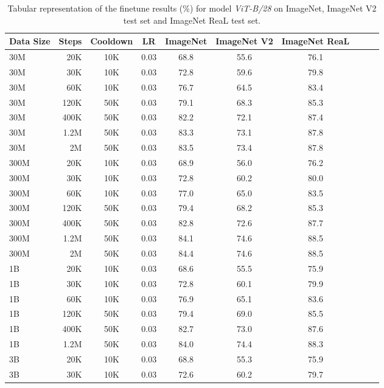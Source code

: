\begin{table}[h]
  \setlength{\tabcolsep}{5pt}
  \setlength{\extrarowheight}{5pt}
  \renewcommand{\arraystretch}{0.75}
  \centering
  \caption{Tabular representation of the finetune results (\%) for model \emph{ViT-B/28} on ImageNet, ImageNet V2 test set and ImageNet ReaL test set.}\label{tbl:b_28_ft}
  \begin{tabulary}{1.0\textwidth}{l r c c c c c c c c}
    \toprule[1pt]
    \bf{Data Size} & \bf{Steps} & \bf{Cooldown} & \bf{LR} & \bf{ImageNet} & \bf{ImageNet V2} & \bf{ImageNet ReaL} \\
    \midrule
30M   & 20K   & 10K   & 0.03 & 68.8 & 55.6 & 76.1 \\
30M   & 30K   & 10K   & 0.03 & 72.8 & 59.6 & 79.8 \\
30M   & 60K   & 10K   & 0.03 & 76.7 & 64.5 & 83.4 \\
30M   & 120K  & 50K   & 0.03 & 79.1 & 68.3 & 85.3 \\
30M   & 400K  & 50K   & 0.03 & 82.2 & 72.1 & 87.4 \\
30M   & 1.2M  & 50K   & 0.03 & 83.3 & 73.1 & 87.8 \\
30M   & 2M    & 50K   & 0.03 & 83.5 & 73.4 & 87.8 \\
\midrule[0.25pt]
300M  & 20K   & 10K   & 0.03 & 68.9 & 56.0 & 76.2 \\
300M  & 30K   & 10K   & 0.03 & 72.8 & 60.2 & 80.0 \\
300M  & 60K   & 10K   & 0.03 & 77.0 & 65.0 & 83.5 \\
300M  & 120K  & 50K   & 0.03 & 79.4 & 68.2 & 85.3 \\
300M  & 400K  & 50K   & 0.03 & 82.8 & 72.6 & 87.7 \\
300M  & 1.2M  & 50K   & 0.03 & 84.1 & 74.6 & 88.5 \\
300M  & 2M    & 50K   & 0.03 & 84.4 & 74.6 & 88.5 \\
\midrule[0.25pt]
1B    & 20K   & 10K   & 0.03 & 68.6 & 55.5 & 75.9 \\
1B    & 30K   & 10K   & 0.03 & 72.8 & 60.1 & 79.9 \\
1B    & 60K   & 10K   & 0.03 & 76.9 & 65.1 & 83.6 \\
1B    & 120K  & 50K   & 0.03 & 79.4 & 69.0 & 85.5 \\
1B    & 400K  & 50K   & 0.03 & 82.7 & 73.0 & 87.6 \\
1B    & 1.2M  & 50K   & 0.03 & 84.0 & 74.4 & 88.3 \\
\midrule[0.25pt]
3B    & 20K   & 10K   & 0.03 & 68.8 & 55.3 & 75.9 \\
3B    & 30K   & 10K   & 0.03 & 72.6 & 60.2 & 79.7 \\
    \bottomrule
  \end{tabulary}
\end{table}

